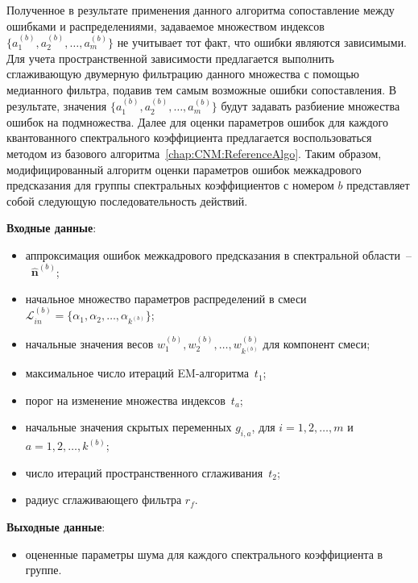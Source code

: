 Полученное в результате применения данного алгоритма сопоставление между ошибками и распределениями, задаваемое множеством индексов $\{a^{(b)}_1,a^{(b)}_2,\ldots,a^{(b)}_m\}$ не учитывает тот факт, что ошибки являются зависимыми. Для учета пространственной зависимости предлагается выполнить сглаживающую двумерную фильтрацию данного множества с помощью медианного фильтра, подавив тем самым возможные ошибки сопоставления. В результате, значения $\{a^{(b)}_1,a^{(b)}_2,\ldots,a^{(b)}_m\}$ будут задавать разбиение множества ошибок на подмножества. Далее для оценки параметров ошибок для каждого квантованного спектрального коэффициента предлагается воспользоваться методом из базового алгоритма~\ref{chap:CNM:ReferenceAlgo}. Таким образом, модифицированный алгоритм оценки параметров ошибок межкадрового предсказания для группы спектральных коэффициентов с номером $b$ представляет собой следующую последовательность действий.

\textbf{Входные данные}:
\begin{itemize}
    \item аппроксимация ошибок межкадрового предсказания в спектральной области~--~$\hat{\mathbf{n}}^{(b)}$;
    \item начальное множество параметров распределений в смеси~$\mathcal{L}_{in}^{(b)} = \{ \alpha_1, \alpha_2,\ldots, \alpha_{k^{(b)}}\}$;
    \item начальные значения весов $w_1^{(b)},w_2^{(b)},\ldots,w_{k^{(b)}}^{(b)}$ для компонент смеси;
    \item максимальное число итераций EM-алгоритма~$t_1$;
    \item порог на изменение множества индексов~$t_a$;
    \item начальные значения скрытых переменных $g_{i,a}$, для $i=1,2,\ldots,m$ и $a=1,2,\ldots,k^{(b)}$;
    \item число итераций пространственного сглаживания~$t_2$;
    \item радиус сглаживающего фильтра $r_f$.
\end{itemize}

\textbf{Выходные данные}:
\begin{itemize}
    \item оцененные параметры шума для каждого спектрального коэффициента в группе.
\end{itemize}

